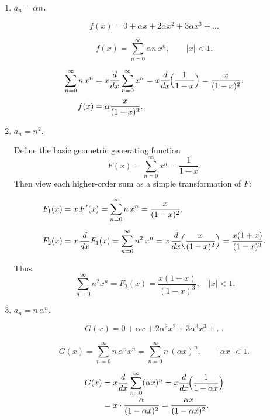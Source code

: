 \documentclass[docmute]{article}
\begin{document}
\begin{enumerate}[label=\textbf{1(\alph*)}\quad]
\medskip
\item \textbf{$a_n=\alpha n$.}

\[
f(x)=0+\alpha x+2\alpha x^{2}+3\alpha x^{3}+\dots
\]

\[
f(x)=\sum_{n=0}^{\infty}\alpha n\,x^{n},\qquad |x|<1.
\]

\[
\begin{aligned}
\sum_{n=0}^{\infty}n\,x^{n}
      &=x\frac{d}{dx}\sum_{n=0}^{\infty}x^{n}
       =x\frac{d}{dx}\!\Bigl(\frac{1}{1-x}\Bigr)
       =\frac{x}{(1-x)^{2}},\\[4pt]
f(x)  &=\alpha\frac{x}{(1-x)^{2}}.
\end{aligned}
\]

\medskip
\item \textbf{$a_{n}=n^{2}$.}

Define the basic geometric generating function
\[
F(x)=\sum_{n=0}^\infty x^n=\frac1{1-x}.
\]
Then view each higher‐order sum as a simple transformation of \(F\):

\[
\begin{aligned}
F_1(x)&=x\,F'(x)
        =\sum_{n=0}^\infty n\,x^n
        =\frac{x}{(1-x)^2},\\[6pt]
F_2(x)&=x\,\frac{d}{dx}F_1(x)
        =\sum_{n=0}^\infty n^2\,x^n
        =x\,\frac{d}{dx}\!\Bigl(\frac{x}{(1-x)^2}\Bigr)
        =\frac{x(1+x)}{(1-x)^3}.
\end{aligned}
\]

Thus
\[
\boxed{\,\sum_{n=0}^\infty n^2 x^n
    =F_2(x)
    =\frac{x(1+x)}{(1-x)^3},\quad |x|<1.}
\]

\medskip
\item \textbf{$a_{n}=n\,\alpha^{n}$.}

\[
G(x)=0+\alpha x+2\alpha^{2}x^{2}+3\alpha^{3}x^{3}+\dots
\]

\[
G(x)=\sum_{n=0}^{\infty}n\,\alpha^{n}x^{n}
      =\sum_{n=0}^{\infty}n\,(\alpha x)^{n},\qquad |\alpha x|<1.
\]

\[
\begin{aligned}
G(x)
  &=x\frac{d}{dx}\sum_{n=0}^{\infty}(\alpha x)^{n}
   =x\frac{d}{dx}\!\Bigl(\frac{1}{1-\alpha x}\Bigr)\\
  &=x\cdot\frac{\alpha}{(1-\alpha x)^{2}}
   =\frac{\alpha x}{(1-\alpha x)^{2}}.
\end{aligned}
\]

\end{enumerate}
\end{document}
